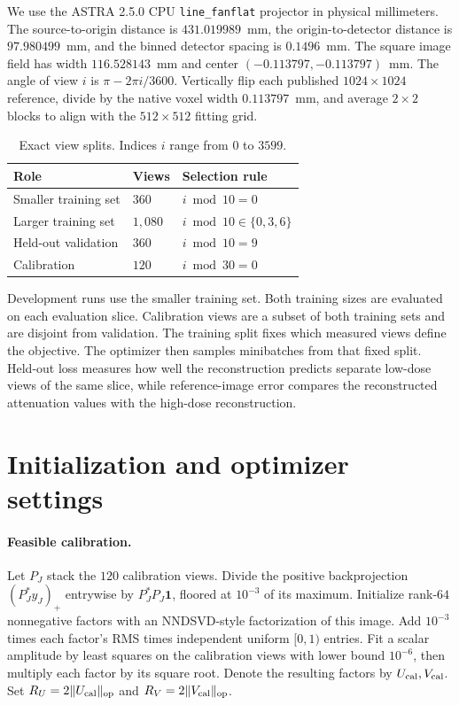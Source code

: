 \documentclass[11pt]{article}
\begin{document}
We use the ASTRA 2.5.0 CPU \texttt{line\_fanflat} projector in physical millimeters. The source-to-origin distance is \(431.019989\)~mm, the origin-to-detector distance is \(97.980499\)~mm, and the binned detector spacing is \(0.1496\)~mm. The square image field has width \(116.528143\)~mm and center \((-0.113797,-0.113797)\)~mm. The angle of view \(i\) is \(\pi-2\pi i/3600\). Vertically flip each published \(1024\times1024\) reference, divide by the native voxel width \(0.113797\)~mm, and average \(2\times2\) blocks to align with the \(512\times512\) fitting grid.

\begin{table}[htbp]
  \centering
  \caption{Exact view splits. Indices \(i\) range from \(0\) to \(3599\).}
  \label{tab:ct-splits}
  \begin{tabular}{@{}lll@{}}
    \toprule
    Role & Views & Selection rule \\
    \midrule
    Smaller training set & \(360\) & \(i\bmod 10=0\) \\
    Larger training set & \(1{,}080\) & \(i\bmod 10\in\{0,3,6\}\) \\
    Held-out validation & \(360\) & \(i\bmod 10=9\) \\
    Calibration & \(120\) & \(i\bmod 30=0\) \\
    \bottomrule
  \end{tabular}
\end{table}

Development runs use the smaller training set. Both training sizes are evaluated on each evaluation slice. Calibration views are a subset of both training sets and are disjoint from validation. The training split fixes which measured views define the objective. The optimizer then samples minibatches from that fixed split. Held-out loss measures how well the reconstruction predicts separate low-dose views of the same slice, while reference-image error compares the reconstructed attenuation values with the high-dose reconstruction.

\section{Initialization and optimizer settings}
\label{sec:ct-settings}

\paragraph{Feasible calibration.}
Let \(P_J\) stack the \(120\) calibration views. Divide the positive backprojection \((P_J^\ast y_J)_+\) entrywise by \(P_J^\ast P_J\mathbf{1}\), floored at \(10^{-3}\) of its maximum. Initialize rank-\(64\) nonnegative factors with an NNDSVD-style factorization of this image. Add \(10^{-3}\) times each factor's RMS times independent uniform \([0,1)\) entries. Fit a scalar amplitude by least squares on the calibration views with lower bound \(10^{-6}\), then multiply each factor by its square root. Denote the resulting factors by \(U_{\rm cal},V_{\rm cal}\). Set \(R_U=2\|U_{\rm cal}\|_{\rm op}\) and \(R_V=2\|V_{\rm cal}\|_{\rm op}\).
\end{document}
